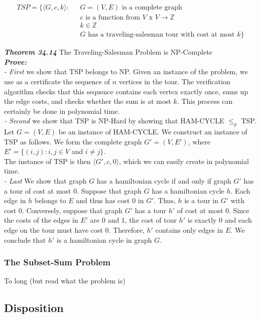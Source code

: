 \begin{align*}
TSP = \{\langle G, c, k \rangle : 	\text{ } &G = (V, E) \text{ is a complete graph}\\
&c \text{ is a function from } V \text{ x } V \rightarrow \mathbb{Z}\\
&k \in \mathbb{Z}\\
&G \text{ has a traveling-salesman tour with cost at most } k \}
\end{align*}

\textbf{\textit{Theorem 34.14}}
The Traveling-Salesman Problem is NP-Complete\\

\textbf{\textit{Prove:}}\\
\textit{- First} we show that TSP belongs to NP. Given an instance of the problem, we use as a certificate the sequence of $n$ vertices in the tour. The verification algorithm checks that this sequence contains each vertex exactly once, sums up the edge costs, and checks whether the sum is at most $k$. This process can certainly be done in polynomial time.\\

\textit{- Second} we show that TSP is NP-Hard by showing that HAM-CYCLE $\leq_p$ TSP. Let $G = (V, E)$ be an instance of HAM-CYCLE. We construct an instance of TSP as follows. We form the complete graph $G' = (V, E')$, where $E' = \{(i, j) : i, j \in V$ and $i \neq j\}$.\\

The instance of TSP is then $\langle G', c, 0 \rangle$, which we can easily create in polynomial time. \\

\textit{- Last} We show that graph $G$ has a hamiltonian cycle if and only if graph $G'$ has a tour of cost at most 0. Suppose that graph $G$ has a hamiltonian cycle $h$. Each edge in $h$ belongs to $E$ and thus has cost 0 in $G'$. Thus, $h$ is a tour in $G'$ with cost 0. Conversely, suppose that graph $G'$ has a tour $h'$ of cost at most 0. Since the costs of the edges in $E'$ are 0 and 1, the cost of tour $h'$ is exactly 0 and each edge on the tour must have cost 0. Therefore, $h'$ contains only edges in $E$. We conclude that $h'$ is a hamiltonian cycle in graph $G$.


\subsubsection{The Subset-Sum Problem}
To long (but read what the problem is)

\subsection{Disposition}















